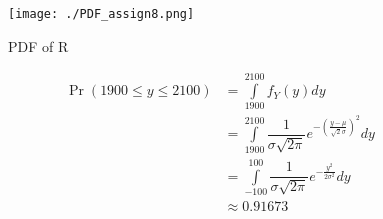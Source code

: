 \documentclass{beamer}
\providecommand{\pr}[1]{\ensuremath{\Pr\left(#1\right)}}
\begin{document}
\begin{frame}
\begin{figure}[H]
\centering
\texttt{[image: ./PDF\_assign8.png]}
\caption{PDF of R}
\end{figure}
\end{frame}
\begin{frame}
\begingroup
\addtolength{\jot}{.1in}
\begin{align}
\pr{1900\leq y \leq 2100}&=\int\limits_{1900}^{2100}f_Y(y)dy\\
&=\int\limits_{1900}^{2100} \dfrac{1}{\sigma\sqrt{2 \pi}}e^{-{(\frac{y-\mu}{\sqrt{2}\sigma})}^2}dy\\
&=\int\limits_{-100}^{100} \dfrac{1}{\sigma\sqrt{2 \pi}}e^{-\frac{y^2}{2\sigma^2}}dy\\
&\approx0.91673
\end{align}
\endgroup
\end{frame}
\end{document}
